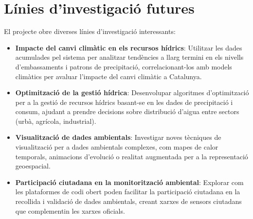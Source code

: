 
\section{Línies d'investigació futures}

El projecte obre diverses línies d'investigació interessants:

\begin{itemize}
    \item \textbf{Impacte del canvi climàtic en els recursos hídrics}: Utilitzar les dades acumulades pel sistema per analitzar tendències a llarg termini en els nivells d'embassaments i patrons de precipitació, correlacionant-los amb models climàtics per avaluar l'impacte del canvi climàtic a Catalunya.
    
    \item \textbf{Optimització de la gestió hídrica}: Desenvolupar algoritmes d'optimització per a la gestió de recursos hídrics basant-se en les dades de precipitació i consum, ajudant a prendre decisions sobre distribució d'aigua entre sectors (urbà, agrícola, industrial).
    
    \item \textbf{Visualització de dades ambientals}: Investigar noves tècniques de visualització per a dades ambientals complexes, com mapes de calor temporals, animacions d'evolució o realitat augmentada per a la representació geoespacial.
    
    \item \textbf{Participació ciutadana en la monitorització ambiental}: Explorar com les plataformes de codi obert poden facilitar la participació ciutadana en la recollida i validació de dades ambientals, creant xarxes de sensors ciutadans que complementin les xarxes oficials.
\end{itemize}

